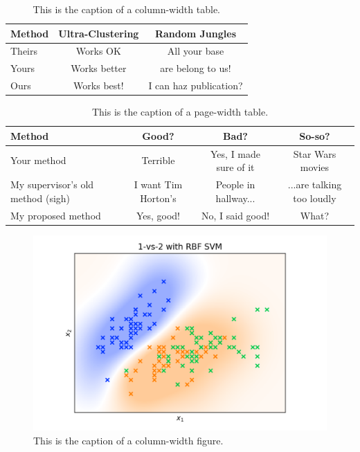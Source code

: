 \documentclass[10pt,twocolumn,letterpaper]{article}
\begin{document}
\begin{table}
   \begin{center}
   \begin{tabular}{|l|c|c|}
   \hline
   Method & Ultra-Clustering & Random Jungles \\
   \hline\hline
   Theirs & Works OK & All your base\\
   Yours & Works better & are belong to us!\\
   Ours & Works best! & I can haz publication?\\
   \hline
   \end{tabular}
   \end{center}
   \caption{This is the caption of a column-width table.\label{first_table}}
\end{table}

\begin{table}
   \begin{center}
   \begin{tabular}{|l|c|c|c|}
   \hline
   Method & Good? & Bad? & So-so? \\
   \hline\hline
   Your method & Terrible & Yes, I made sure of it & Star Wars movies \\
   My supervisor's old method (sigh) & I want Tim Horton's & People in hallway... & ...are talking too loudly \\
   My proposed method  & Yes, good! & No, I said good! & What? \\
   \hline
   \end{tabular}
   \end{center}
   \caption{This is the caption of a page-width table.\label{second_table}}
\end{table}


\begin{figure}
   \begin{center}
   \includegraphics[width=\linewidth]{sample_image.png}
   \end{center}
      \caption{This is the caption of a column-width figure.\label{first_figure}}
\end{figure}
   
\end{document}

